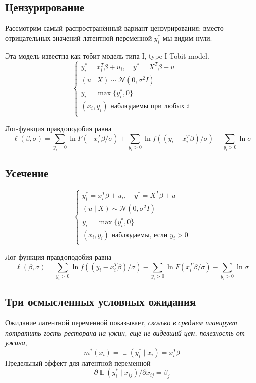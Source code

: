 \documentclass[12pt]{article}
\DeclareMathOperator{\E}{\mathbb{E}}
\newcommand{\cN}{\mathcal{N}}
\begin{document}
\subsection{Цензурирование}

Рассмотрим самый распространённый вариант цензурирования: вместо отрицательных значений латентной переменной $y_i^*$ мы видим нули.

Эта модель известна как тобит модель типа I, type I Tobit model. 
\[
\begin{cases}
    y_i^* = x_i^T \beta + u_i, \quad y^* = X^T \beta + u \\
    (u \mid X) \sim \cN(0, \sigma^2 I) \\
    y_i = \max\{y_i^*, 0\} \\
    (x_i, y_i) \text{ наблюдаемы при любых }i \\
\end{cases}
\]

Лог-функция правдоподобия равна
\[
\ell(\beta, \sigma) = \sum_{y_i = 0} {\ln F(-x_i^T \beta / \sigma)} + \sum_{y_i > 0} {\ln f((y_i-x_i^T\beta) / \sigma)} - \sum_{y_i > 0} \ln \sigma
\]


\subsection{Усечение}

\[
\begin{cases}
    y_i^* = x_i^T \beta + u_i, \quad y^* = X^T \beta + u \\
    (u \mid X) \sim \cN(0, \sigma^2 I) \\
    y_i = \max\{y_i^*, 0\} \\
    (x_i, y_i) \text{ наблюдаемы, если } y_i > 0 \\
\end{cases}
\]

Лог-функция правдоподобия равна
\[
\ell(\beta, \sigma) = \sum_{y_i > 0} {\ln f((y_i-x_i^T\beta) / \sigma)} - \sum_{y_i > 0}{\ln F(x_i^T \beta / \sigma)} - \sum_{y_i > 0} \ln \sigma
\]


\subsection{Три осмысленных условных ожидания}

Ожидание латентной переменной показывает, \emph{сколько в среднем планирует потратить гость ресторана на ужин, ещё не видевший цен, полезность от ужина},
\[
m^*(x_i) = \E(y^*_i \mid  x_i) = x_i^T \beta
\]
Предельный эффект для латентной переменной 
\[
\partial \E(y^*_i \mid  x_{ij})/ \partial x_{ij} = \beta_j
\]
\end{document}
